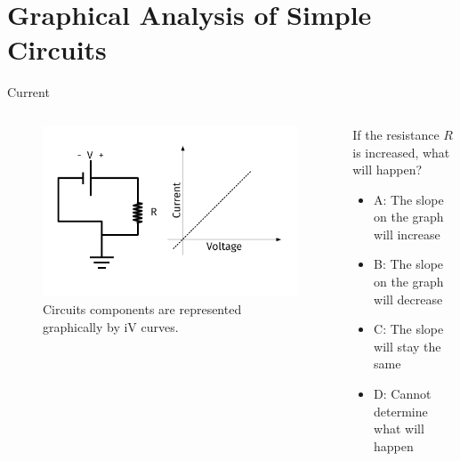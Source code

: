 \documentclass{beamer}
\begin{document}
\section{Graphical Analysis of Simple Circuits}

\begin{frame}{Current}
\begin{columns}[T]
\begin{column}{0.5\textwidth}
\begin{figure}
\centering
\includegraphics[width=\textwidth,trim=0.5cm 0cm 1cm 0cm,clip=true]{figures/iVCurve.pdf}
\caption{\label{fig:iVCurve1} Circuits components are represented graphically by iV curves.}
\end{figure}
\end{column}
\begin{column}{0.5\textwidth}
\small
If the resistance $R$ is increased, what will happen?
\begin{itemize}
\item A: The slope on the graph will increase
\item B: The slope on the graph will decrease
\item C: The slope will stay the same
\item D: Cannot determine what will happen
\end{itemize}
\end{column}
\end{columns}
\end{frame}
\end{document}

